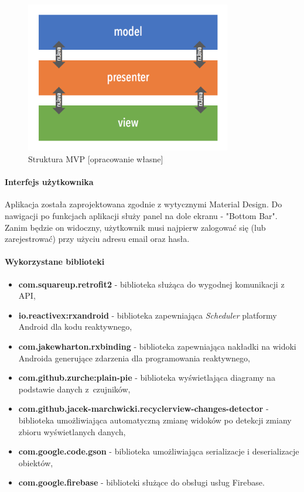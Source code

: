 \begin{figure}[H]
    \centering
    \includegraphics[width=9cm]{android-mvp.png}
    \caption{Struktura MVP [opracowanie własne]}
\end{figure}

\paragraph{Interfejs użytkownika} Aplikacja została zaprojektowana zgodnie z wytycznymi Material Design. \cite{MDESIGN}
Do nawigacji po funkcjach aplikacji służy panel na dole ekranu - "Bottom Bar".
Zanim będzie on widoczny, użytkownik musi najpierw zalogować się (lub zarejestrować) przy użyciu adresu email oraz hasła.

\paragraph{Wykorzystane biblioteki}
\begin{itemize}
    \item \textbf{com.squareup.retrofit2} - biblioteka służąca do wygodnej komunikacji z API,
    \item \textbf{io.reactivex:rxandroid} - biblioteka zapewniająca \textit{Scheduler} platformy Android dla kodu reaktywnego,
    \item \textbf{com.jakewharton.rxbinding} - biblioteka zapewniająca nakładki na widoki Androida generujące zdarzenia dla programowania reaktywnego,
    \item \textbf{com.github.zurche:plain-pie} - biblioteka wyświetlająca diagramy na podstawie danych z~czujników,
    \item \textbf{com.github.jacek-marchwicki.recyclerview-changes-detector} - biblioteka umożliwiająca automatyczną zmianę widoków po detekcji zmiany zbioru wyświetlanych danych,
    \item \textbf{com.google.code.gson} - biblioteka umożliwiająca serializacje i deserializacje obiektów,
    \item \textbf{com.google.firebase} - biblioteki służące do obsługi usług Firebase.
\end{itemize}

